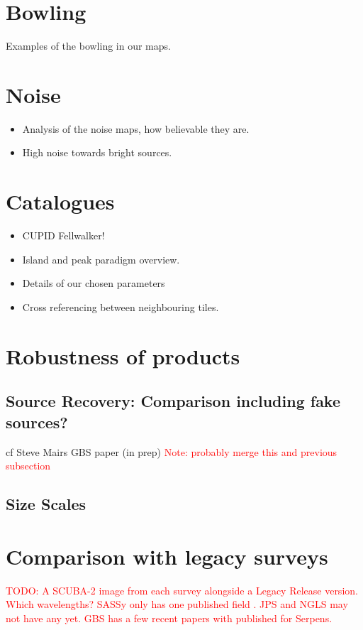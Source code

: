 \documentclass[usenatbib]{mn2e}
\newcommand{\todo}[1]{\textcolor{red}{TODO: #1}}
\newcommand{\note}[1]{\textcolor{red}{Note: #1}}
\begin{document}
\section{Bowling}
Examples of the bowling in our maps.

\section{Noise}
\begin{itemize}
\item Analysis of the noise maps, how believable they are.
\item High noise towards bright sources.
\end{itemize}



\section{Catalogues}
\begin{itemize}
\item CUPID \citep{cupid} Fellwalker! \citep{Berry2015}
\item Island and peak paradigm overview.
\item Details of our chosen parameters
\item Cross referencing between neighbouring tiles.
\end{itemize}


\section{Robustness of products}

\subsection{Source Recovery: Comparison including fake sources?}
cf Steve Mairs GBS paper (in prep)
\note{ probably merge this and previous subsection}

\subsection{Size Scales}

\section{Comparison with legacy surveys}

\todo{A SCUBA-2 image from each survey alongside a Legacy Release
  version. Which wavelengths? SASSy only has one published field
  \citep{MacKenzie2011}. JPS and NGLS may not have any yet. GBS has a
  few recent papers with \citet{Rumble2015} published for Serpens.}
\end{document}
